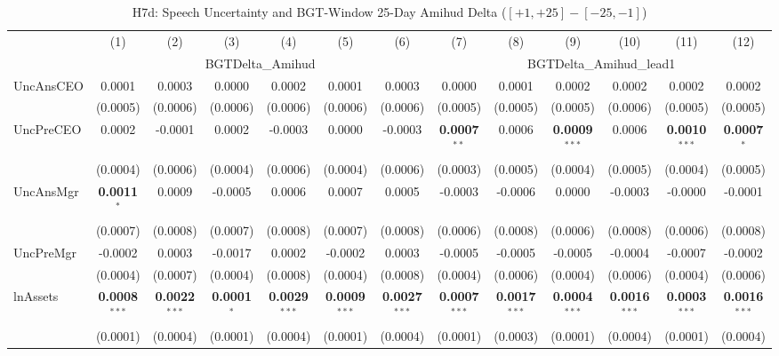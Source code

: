 \begin{landscape}
\begin{table}[H]
\setlength{\tabcolsep}{3pt}
\renewcommand{\arraystretch}{0.85}
\centering
\caption{H7d: Speech Uncertainty and BGT-Window 25-Day Amihud Delta ($[+1,+25]-[-25,-1]$)}
\label{tab:h7d}
\scriptsize
\begin{tabular}{lcccccccccccc}
\toprule
 & (1) & (2) & (3) & (4) & (5) & (6) & (7) & (8) & (9) & (10) & (11) & (12) \\
 & \multicolumn{6}{c}{BGTDelta\_Amihud} & \multicolumn{6}{c}{BGTDelta\_Amihud\_lead1} \\
\cmidrule(lr){2-7} \cmidrule(lr){8-13}
\midrule
UncAnsCEO & 0.0001 & 0.0003 & 0.0000 & 0.0002 & 0.0001 & 0.0003 & 0.0000 & 0.0001 & 0.0002 & 0.0002 & 0.0002 & 0.0002 \\
 & (0.0005) & (0.0006) & (0.0006) & (0.0006) & (0.0006) & (0.0006) & (0.0005) & (0.0005) & (0.0005) & (0.0006) & (0.0005) & (0.0005) \\
UncPreCEO & 0.0002 & -0.0001 & 0.0002 & -0.0003 & 0.0000 & -0.0003 & \textbf{0.0007}$^{**}$ & 0.0006 & \textbf{0.0009}$^{***}$ & 0.0006 & \textbf{0.0010}$^{***}$ & \textbf{0.0007}$^{*}$ \\
 & (0.0004) & (0.0006) & (0.0004) & (0.0006) & (0.0004) & (0.0006) & (0.0003) & (0.0005) & (0.0004) & (0.0005) & (0.0004) & (0.0005) \\
UncAnsMgr & \textbf{0.0011}$^{*}$ & 0.0009 & -0.0005 & 0.0006 & 0.0007 & 0.0005 & -0.0003 & -0.0006 & 0.0000 & -0.0003 & -0.0000 & -0.0001 \\
 & (0.0007) & (0.0008) & (0.0007) & (0.0008) & (0.0007) & (0.0008) & (0.0006) & (0.0008) & (0.0006) & (0.0008) & (0.0006) & (0.0008) \\
UncPreMgr & -0.0002 & 0.0003 & -0.0017 & 0.0002 & -0.0002 & 0.0003 & -0.0005 & -0.0005 & -0.0005 & -0.0004 & -0.0007 & -0.0002 \\
 & (0.0004) & (0.0007) & (0.0004) & (0.0008) & (0.0004) & (0.0008) & (0.0004) & (0.0006) & (0.0004) & (0.0006) & (0.0004) & (0.0006) \\
\midrule
lnAssets & \textbf{0.0008}$^{***}$ & \textbf{0.0022}$^{***}$ & \textbf{0.0001}$^{*}$ & \textbf{0.0029}$^{***}$ & \textbf{0.0009}$^{***}$ & \textbf{0.0027}$^{***}$ & \textbf{0.0007}$^{***}$ & \textbf{0.0017}$^{***}$ & \textbf{0.0004}$^{***}$ & \textbf{0.0016}$^{***}$ & \textbf{0.0003}$^{***}$ & \textbf{0.0016}$^{***}$ \\
 & (0.0001) & (0.0004) & (0.0001) & (0.0004) & (0.0001) & (0.0004) & (0.0001) & (0.0003) & (0.0001) & (0.0004) & (0.0001) & (0.0004) \\

\end{tabular}
\end{table}
\end{landscape}
